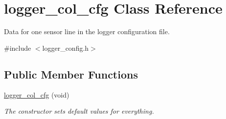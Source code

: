 \hypertarget{classlogger__col__cfg}{\section{logger\-\_\-col\-\_\-cfg Class Reference}
\label{classlogger__col__cfg}
}


Data for one sensor line in the logger configuration file.  




{\ttfamily \#include $<$logger\-\_\-config.\-h$>$}

\subsection*{Public Member Functions}
\begin{DoxyCompactItemize}
\item 
\hypertarget{classlogger__col__cfg_a6e7d9e299aee792b6914dcde5868ebe4}{\hyperlink{classlogger__col__cfg_a6e7d9e299aee792b6914dcde5868ebe4}{logger\-\_\-col\-\_\-cfg} (void)}\label{classlogger__col__cfg_a6e7d9e299aee792b6914dcde5868ebe4}

\begin{DoxyCompactList}\small\item\em The constructor sets default values for everything. \end{DoxyCompactList}\end{DoxyCompactItemize}

